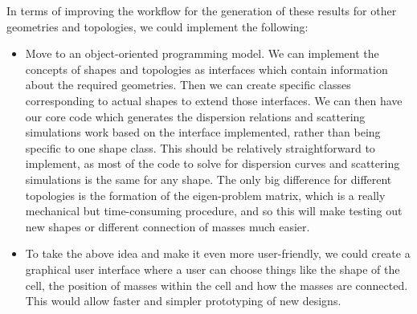 In terms of improving the workflow for the generation of these results for
other geometries and topologies, we could implement the following:
\begin{itemize}
\item Move to an object-oriented programming model. We can implement the
concepts of shapes and topologies as interfaces which contain information about
the required geometries. Then we can create specific classes corresponding to
actual shapes to extend those interfaces. We can then have our core code which
generates the dispersion relations and scattering simulations work based on the
interface implemented, rather than being specific to one shape class. This
should be relatively straightforward to implement, as most of the code to solve
for dispersion curves and scattering simulations is the same for any shape. The
only big difference for different topologies is the formation of the
eigen-problem matrix, which is a really mechanical but time-consuming
procedure, and so this will make testing out new shapes or different connection
of masses much easier.

\item To take the above idea and make it even more user-friendly, we could
create a graphical user interface where a user can choose things like the shape
of the cell, the position of masses within the cell and how the masses are
connected. This would allow faster and simpler prototyping of new designs.
\end{itemize}
